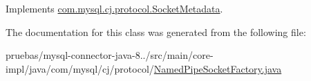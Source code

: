 Implements \mbox{\hyperlink{interfacecom_1_1mysql_1_1cj_1_1protocol_1_1_socket_metadata_ae786655db2998b2391b183fdad43e02c}{com.\+mysql.\+cj.\+protocol.\+Socket\+Metadata}}.



The documentation for this class was generated from the following file\+:\begin{DoxyCompactItemize}
\item 
pruebas/mysql-\/connector-\/java-\/8../src/main/core-\/impl/java/com/mysql/cj/protocol/\mbox{\hyperlink{_named_pipe_socket_factory_8java}{Named\+Pipe\+Socket\+Factory.\+java}}\end{DoxyCompactItemize}
